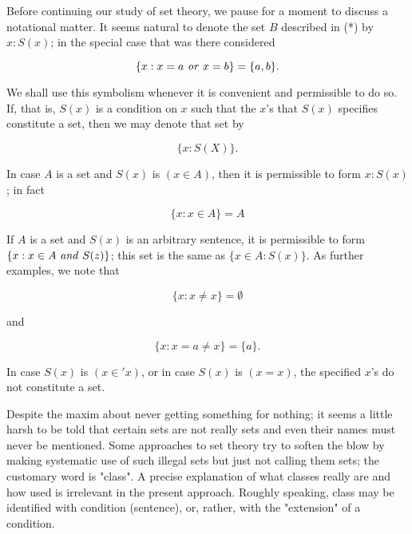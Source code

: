 Before continuing our study of set theory, we pause for a moment to discuss a notational matter. It seems natural to denote the set $B$ described in (*) by ${x: S(x)}$; in the special case that was there considered

\begin{equation*}
\{ x : x = a \text{ \textit{or} } x = b \} = \{ a,b \}.
\end{equation*}

We shall use this symbolism whenever it is convenient and permissible to do so. If, that is, $S(x)$ is a condition on $x$ such that the $x$'s that $S(x)$ specifies constitute a set, then we may denote that set by 

\begin{equation*}
\{ x : S(X) \}.
\end{equation*}

In case $A$ is a set and $S(x)$ is $(x \in A)$, then it is permissible to form ${x: S(x)}$; in fact 

\begin{equation*}
\{ x : x \in A \} = A
\end{equation*}

If $A$ is a set and $S(x)$ is an arbitrary sentence, it is permissible to form $ \{ x : x \in A \text{ \textit{and} } S(z) \}$; this set is the same as $\{x \in A: S(x) \}$. As further examples, we note that 

\begin{equation*}
\{ x : x \neq x \} = \emptyset
\end{equation*}

and

\begin{equation*}
\{ x : x = a\neq x \} = \{ a \}.
\end{equation*}

In case $S(x)$ is $(x \in ' x)$, or in case $S(x)$ is $(x = x)$, the specified $x$'s do not constitute a set. 

Despite the maxim about never getting something for nothing; it seems a little harsh to be told that certain sets are not really sets and even their names must never be mentioned. Some approaches to set theory try to soften the blow by making systematic use of such illegal sets but just not calling them sets; the customary word is "class". A precise explanation of what classes really are and how used is irrelevant in the present approach. Roughly speaking, class may be identified with condition (sentence), or, rather, with the "extension" of a condition.